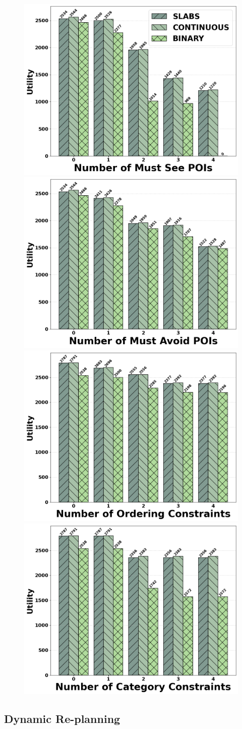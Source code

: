 \begin{figure}[t]
\centering
\includegraphics[width=0.48\columnwidth]{plots/mustsee.png}
\includegraphics[width=0.48\columnwidth]{plots/mustavoid.png}
\includegraphics[width=0.48\columnwidth]{plots/ordering.png}
\includegraphics[width=0.48\columnwidth]{plots/category.png}
\label{fig:personalizedconstraints}
\end{figure}

\subsection{Dynamic Re-planning}
\label{sec:exp dynamic replanning} 

